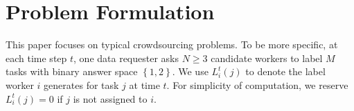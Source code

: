 \section{Problem Formulation}
\label{PF}
This paper focuses on typical crowdsourcing problems. To be more specific, at each time step $t$, one data requester asks $N \geq 3$ candidate workers to label $M$ tasks with binary answer space $\left\{1,2\right\}$. We use $L^t_i(j)$ to denote the label worker $i$ generates for task $j$ at time $t$. For simplicity of computation, we reserve $L^t_i(j) = 0$ if  $j$ is not assigned to $i$.


